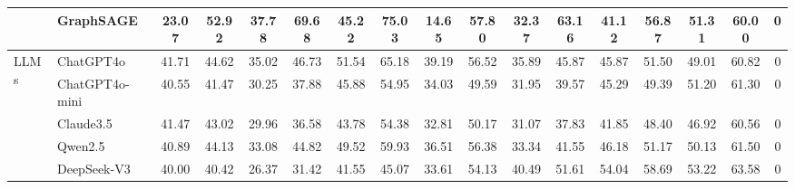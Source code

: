 \begin{table*}[ht]
{\begin{tabular}{ll|cc|cc|cc|cc|cc|cc|cc|c}
& GraphSAGE & 23.07 & \textbf{52.92} & 37.78 & 69.68 & 45.22 & 75.03 & 14.65 & 57.80 & 32.37 & 63.16 & 41.12 & 56.87 & 51.31 & 60.00 & 0 \\
\midrule
\multirow{5}{*}{LLMs} 
& ChatGPT4o & 41.71 & 44.62 & 35.02 & 46.73 & 51.54 & 65.18 & 39.19 & 56.52 & 35.89 & 45.87 & 45.87 & 51.50 & 49.01 & 60.82 & 0 \\
& ChatGPT4o-mini & 40.55 & 41.47 & 30.25 & 37.88 & 45.88 & 54.95 & 34.03 & 49.59 & 31.95 & 39.57 & 45.29 & 49.39 & 51.20 & 61.30 & 0 \\
& Claude3.5 & 41.47 & 43.02 & 29.96 & 36.58 & 43.78 & 54.38 & 32.81 & 50.17 & 31.07 & 37.83 & 41.85 & 48.40 & 46.92 & 60.56 & 0 \\
& Qwen2.5 & 40.89 & 44.13 & 33.08 & 44.82 & 49.52 & 59.93 & 36.51 & 56.38 & 33.34 & 41.55 & 46.18 & 51.17 & 50.13 & 61.50 & 0 \\
& DeepSeek-V3 & 40.00 & 40.42 & 26.37 & 31.42 & 41.55 & 45.07 & 33.61 & 54.13 & 40.49 & 51.61 & 54.04 & 58.69 & 53.22 & 63.58 & 0 \\
\bottomrule
\end{tabular}
}
\end{table*}